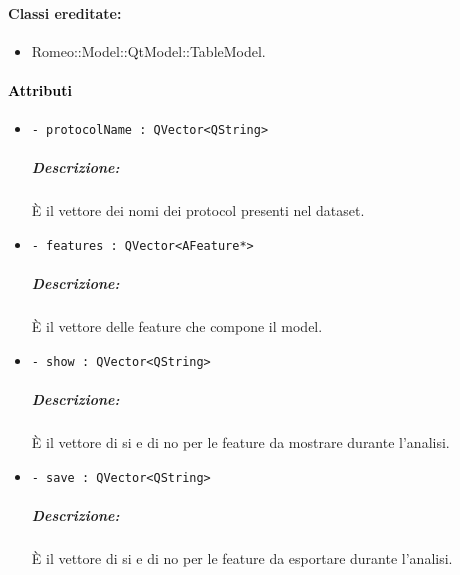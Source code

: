 \paragraph{Classi ereditate:}
\begin{itemize}
	\item Romeo::Model::QtModel::TableModel.
\end{itemize}

\paragraph{\textcolor{black}{Attributi\\}}
	\begin{itemize}
		\item \color{teal}\verb!- protocolName : QVector<QString>!
		\color{black}
		\subparagraph{Descrizione:} È il vettore dei nomi dei protocol\g{} presenti nel dataset\g{}.	
		\item \color{teal}\verb!- features : QVector<AFeature*>!
				\color{black}
				\subparagraph{Descrizione:} È il vettore delle feature\g{} che compone il model.				
		\item \color{teal}\verb!- show : QVector<QString>!
				\color{black}
				\subparagraph{Descrizione:} È il vettore di si e di no per le feature\g{} da mostrare durante l'analisi.				
		\item \color{teal}\verb!- save : QVector<QString>!
				\color{black}
				\subparagraph{Descrizione:} È il vettore di si e di no per le feature\g{} da esportare durante l'analisi.
	\end{itemize}
	
